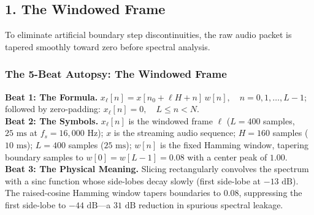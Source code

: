 \documentclass[11pt,a4paper]{article}
\begin{document}
\clearpage

\vspace*{-4.5mm}
\subsection*{1. The Windowed Frame}
\vspace{-2mm}

To eliminate artificial boundary step discontinuities, the raw audio packet is tapered smoothly toward zero before spectral analysis.

\subsubsection*{The 5-Beat Autopsy: The Windowed Frame}
\vspace{-2mm}
{\small
\textbf{Beat 1: The Formula.} $x_\ell[n] = x[n_0 + \ell H + n] \, w[n], \quad n = 0, 1, \dots, L-1$; followed by zero-padding: $x_\ell[n] = 0, \quad L \le n < N$.\\[1mm]
\textbf{Beat 2: The Symbols.} $x_\ell[n]$ is the windowed frame $\ell$ ($L = 400$ samples, $25\text{ ms}$ at $f_s = 16{,}000\text{ Hz}$); $x$ is the streaming audio sequence; $H = 160$ samples ($10\text{ ms}$); $L = 400$ samples ($25\text{ ms}$); $w[n]$ is the fixed Hamming window, tapering boundary samples to $w[0] = w[L-1] = 0.08$ with a center peak of $1.00$.\\[1mm]
\textbf{Beat 3: The Physical Meaning.} Slicing rectangularly convolves the spectrum with a sinc function whose side-lobes decay slowly (first side-lobe at $-13\text{ dB}$). The raised-cosine Hamming window tapers boundaries to $0.08$, suppressing the first side-lobe to $-44\text{ dB}$---a $31\text{ dB}$ reduction in spurious spectral leakage.
}
\end{document}
